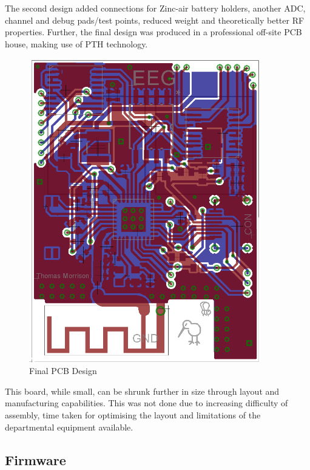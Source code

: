 \documentclass[]{article}
\begin{document}
The second design added connections for Zinc-air battery holders, another \ac{ADC}, channel and debug pads/test points, reduced weight and theoretically better RF properties. Further, the final design was produced in a professional off-site \ac{PCB} house, making use of \ac{PTH} technology.

\begin{figure}[htb]
	\begin{center}
		\includegraphics[width = 0.9\textwidth]{boardfinal}
	\end{center}
	\caption{Final PCB Design}
	\label{fig:boardfinal}
\end{figure}

This board, while small, can be shrunk further in size through layout and manufacturing capabilities. This was not done due to increasing difficulty of assembly, time taken for optimising the layout and limitations of the departmental equipment available. 


\clearpage
\subsection{Firmware}
\end{document}

